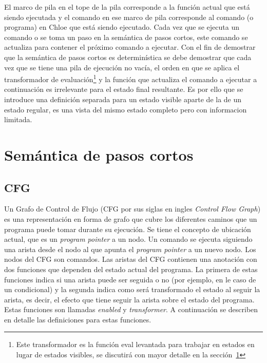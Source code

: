 El marco de pila en el tope de la pila corresponde a la función actual que está siendo ejecutada y el comando en ese marco de pila corresponde al comando (o programa) en Chloe que está siendo ejecutado.
Cada vez que se ejecuta un comando o se toma un paso en la semántica de pasos cortos, este comando se actualiza para contener el próximo comando a ejecutar.
Con el fin de demostrar que la semántica de pasos cortos es determinística se debe demostrar que cada vez que se tiene una pila de ejecución no vacía, el orden en que se aplica el transformador de evaluación\footnote{Este transformador es la función eval levantada para trabajar en estados en lugar de estados visibles, se discutirá con mayor detalle en la sección~\ref{section:small_step}} y la función que actualiza el comando a ejecutar a continuación es irrelevante para el estado final resultante.
Es por ello que se introduce una definición separada para un estado visible aparte de la de un estado regular, es una vista del mismo estado completo pero con informacion limitada.

\section{Semántica de pasos cortos}\label{section:small_step}

\begin{comment}
add a little summary here.
\end{comment}

\subsection{CFG}\label{subsection:cfg}

Un Grafo de Control de Flujo (CFG por sus siglas en ingles \textit{Control Flow Graph}) es una representación en forma de grafo que cubre los diferentes caminos que un programa puede tomar durante su ejecución.
Se tiene el concepto de ubicación actual, que es un \textit{program pointer} a un nodo.
Un comando se ejecuta siguiendo una arista desde el nodo al que apunta el \textit{program pointer} a un nuevo nodo.
Los nodos del CFG son comandos.
Las aristas del CFG contienen una anotación con dos funciones que dependen del estado actual del programa.
La primera de estas funciones indica si una arista puede ser seguida o no (por ejemplo, en le caso de un condicional) y la segunda indica como será transformado el estado al seguir la arista, es decir, el efecto que tiene seguir la arista sobre el estado del programa.
Estas funciones son llamadas \textit{enabled} y \textit{transformer}.
A continuación se describen en detalle las definiciones para estas funciones.


